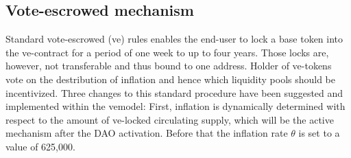 \subsection{Vote-escrowed mechanism}
\label{subsec:ve-mechanism}
Standard vote-escrowed (ve) rules enables the end-user to lock a base token into the ve-contract for a period of one week to up to four years.
Those locks are, however, not transferable and thus bound to one address.
Holder of ve-tokens vote on the destribution of inflation and hence which liquidity pools should be incentivized.
Three changes to this standard procedure have been suggested\cite{andre-conje} and implemented within the ve\aphra model: First, inflation is dynamically determined with respect to the amount of ve-locked circulating supply, which will be the active mechanism after the DAO activation.
Before that the inflation rate $\theta$ is set to a value of 625,000.

